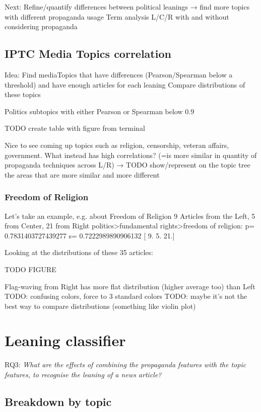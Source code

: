 Next:
Refine/quantify differences between political leanings → find more topics with different propaganda usage
Term analysis L/C/R with and without considering propaganda





\subsection{IPTC Media Topics correlation}
Idea:
Find mediaTopics that have differences (Pearson/Spearman below a threshold) and have enough articles for each leaning
Compare distributions of these topics

Politics subtopics with either Pearson or Spearman below 0.9

TODO create table with figure from terminal

Nice to see coming up topics such as religion, censorship, veteran affairs, government.
What instead has high correlations? (=is more similar in quantity of propaganda techniques across L/R) → TODO show/represent on the topic tree the areas that are more similar and more different


\subsubsection{Freedom of Religion}
Let’s take an example, e.g. about Freedom of Religion
9 Articles from the Left, 5 from Center, 21 from Right
politics>fundamental rights>freedom of religion: p= 0.7831403727439277 s= 0.7222989890906132 [ 9.  5. 21.]

Looking at the distributions of these 35 articles:

TODO FIGURE

Flag-waving from Right has more flat distribution (higher average too) than Left
TODO: confusing colors, force to 3 standard colors
TODO: maybe it’s not the best way to compare distributions (something like violin plot)



\section{\statusred Leaning classifier}
\label{sec:topic_classifier_propaganda}

RQ3: \emph{What are the effects of combining the propaganda features with the topic features, to recognise the leaning of a news article?}

\subsection{Breakdown by topic}


